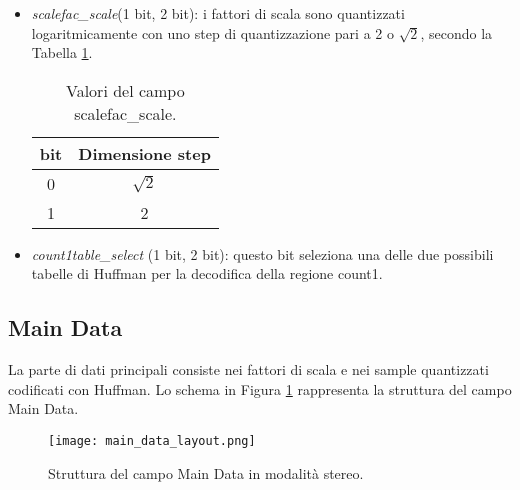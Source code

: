 \begin{itemize}
\begin{itemize}
						\item \textit{scalefac\_scale}(1 bit, 2 bit): i fattori di scala sono quantizzati logaritmicamente con uno step di quantizzazione pari a 2 o $\sqrt{2}$, secondo la Tabella \ref{tab:campo_scalefac_scale}.
						
							\begin{table}[h!]
								\centering
								\begin{tabular}{|c|c|}
									\multicolumn{1}{c}{\textbf{bit}} & \multicolumn{1}{c}{\textbf{Dimensione step}}\\
									\hline
									0 & $\sqrt{2}$\\
									\hline
									1 & 2\\
									\hline
								\end{tabular}
								\caption{Valori del campo scalefac\_scale.}
								\label{tab:campo_scalefac_scale}
							\end{table}
						
						\item \textit{count1table\_select} (1 bit, 2 bit): questo bit seleziona una delle due possibili tabelle di Huffman per la decodifica della regione count1.
						
					\end{itemize}
				
			\end{itemize}
		
		\subsection{Main Data} \label{subsec:main_data}
			
			La parte di dati principali consiste nei fattori di scala e nei sample quantizzati codificati con Huffman. Lo schema in Figura \ref{fig:main_data_layout} rappresenta la struttura del campo Main Data.
			
			\begin{figure}[h!]
				\centering
					\texttt{[image: main\_data\_layout.png]}
				\caption{Struttura del campo Main Data in modalità stereo.}
				\label{fig:main_data_layout}
			\end{figure}
			
